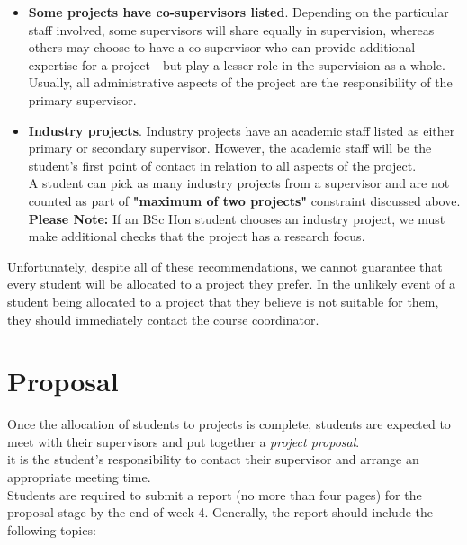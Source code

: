 \begin{itemize}
\item {\bf Some projects have co-supervisors listed}.  Depending on
  the particular staff involved, some supervisors will share equally
  in supervision, whereas others may choose to have a co-supervisor
  who can provide additional expertise for a project - but play a
  lesser role in the supervision as a whole.  Usually, all administrative aspects of the project are the responsibility of the primary supervisor.

\item {\bf Industry projects}. Industry projects have an academic staff listed as either primary or secondary supervisor. However, the academic staff will be the student's first point of contact in relation to all aspects of the project. \\
A student can pick as many industry projects from a supervisor and are not counted as part of \textbf{"maximum of two projects"} constraint discussed above.\\

\textbf{Please Note:} If an BSc Hon student chooses an industry project, we must make additional checks that the project has a research focus. 

\end{itemize}
Unfortunately, despite all of these recommendations, we cannot
guarantee that every student will be allocated to a project they
prefer.  In the unlikely event of a student being allocated to a
project that they believe is not suitable for them, they should
immediately contact the course coordinator.

\section{Proposal}

Once the allocation of students to projects is complete, students are
expected to meet with their supervisors and put together a {\em
  project proposal}.\\

 it is the student's responsibility to contact their
supervisor and arrange an appropriate meeting time.\\
{Students are required to submit a report (no more than four pages) for the proposal stage by the end of week 4. Generally,
the report should include the following topics:}

